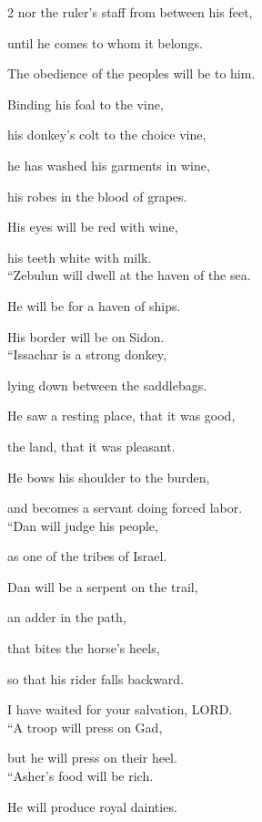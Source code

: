 \begin{multicols}{2}
	nor the ruler’s staff from between his feet,
	
	until he comes to whom it belongs.
	
	The obedience of the peoples will be to him.
	
	\myverse{}Binding his foal to the vine,
	
	his donkey’s colt to the choice vine,
	
	he has washed his garments in wine,
	
	his robes in the blood of grapes.
	
	\myverse{}His eyes will be red with wine,
	
	his teeth white with milk.
	\\
	
	\myverse{}“Zebulun will dwell at the haven of the sea.
	
	He will be for a haven of ships.
	
	His border will be on Sidon.
	\\ 
	
	\myverse{}“Issachar is a strong donkey,
	
	lying down between the saddlebags.
	
	\myverse{}He saw a resting place, that it was good,
	
	the land, that it was pleasant.
	
	He bows his shoulder to the burden,
	
	and becomes a servant doing forced labor.
	\\ 
	
	\myverse{}“Dan will judge his people,
	
	as one of the tribes of Israel.
	
	\myverse{}Dan will be a serpent on the trail,
	
	an adder in the path,
	
	that bites the horse’s heels,
	
	so that his rider falls backward.
	
	\myverse{}I have waited for your salvation, LORD.
	\\
	
	\myverse{}“A troop will press on Gad,
	
	but he will press on their heel.  
	\\
	
	\myverse{}“Asher’s food will be rich.
	
	He will produce royal dainties.  
	\\
	

\end{multicols}
